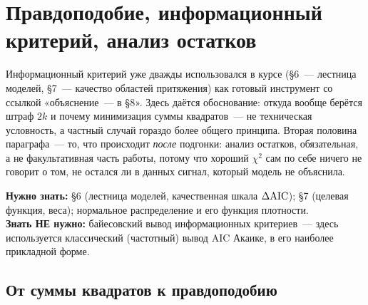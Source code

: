 %
%
\section{Правдоподобие, информационный критерий, анализ остатков}
\label{sec:likelihood}

Информационный критерий уже дважды использовался в курсе (§6~--- лестница моделей, §7~---
качество областей притяжения) как готовый инструмент со ссылкой «объяснение~--- в §8». Здесь
даётся обоснование: откуда вообще берётся штраф $2k$ и почему минимизация суммы квадратов~---
не техническая условность, а частный случай гораздо более общего принципа. Вторая половина
параграфа~--- то, что происходит \emph{после} подгонки: анализ остатков, обязательная, а не
факультативная часть работы, потому что хороший $\chi^2$ сам по себе ничего не говорит о том,
не остался ли в данных сигнал, который модель не объяснила.

\begin{tcolorbox}[enhanced,colback=cPanel,colframe=cGrid,boxrule=0.8pt,arc=2pt,
                  title={\bfseries\color{cAccent} Пререквизиты},coltitle=cAccent,
                  attach boxed title to top left={xshift=6pt,yshift=-2pt},
                  boxed title style={colback=cPanel,boxrule=0pt,arc=0pt},top=10pt]
\textbf{Нужно знать:} §6 (лестница моделей, качественная шкала $\Delta\mathrm{AIC}$); §7 (целевая функция,
веса); нормальное распределение и его функция плотности.\\[0.3em]
\textbf{Знать НЕ нужно:} байесовский вывод информационных критериев~--- здесь используется
классический (частотный) вывод AIC Акаике, в его наиболее прикладной форме.
\end{tcolorbox}

\subsection{От суммы квадратов к правдоподобию}
\label{subsec:likelihood}

